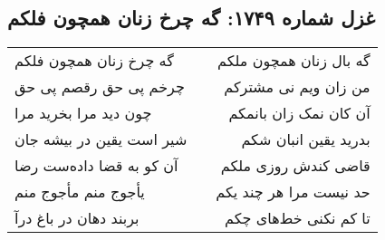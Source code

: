 \begin{center}
\section*{غزل شماره ۱۷۴۹: گه چرخ زنان همچون فلکم}
\label{sec:1749}
\begin{longtable}{l p{0.5cm} r}
گه چرخ زنان همچون فلکم
&&
گه بال زنان همچون ملکم
\\
چرخم پی حق رقصم پی حق
&&
من زان ویم نی مشترکم
\\
چون دید مرا بخرید مرا
&&
آن کان نمک زان بانمکم
\\
شیر است یقین در بیشه جان
&&
بدرید یقین انبان شکم
\\
آن کو به قضا داده‌ست رضا
&&
قاضی کندش روزی ملکم
\\
یأجوج منم مأجوج منم
&&
حد نیست مرا هر چند یکم
\\
بربند دهان در باغ درآ
&&
تا کم نکنی خط‌های چکم
\\
\end{longtable}
\end{center}
